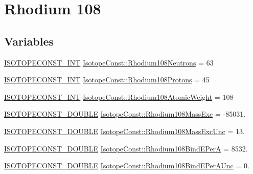 \hypertarget{group___isotope_const-_rhodium-_rh108}{}\section{Rhodium 108}
\label{group___isotope_const-_rhodium-_rh108}
\subsection*{Variables}
\begin{DoxyCompactItemize}
\item 
\mbox{\hyperlink{group___isotope_const-_macros_ga5f18360b3e99483a35c32d789e62621c}{I\+S\+O\+T\+O\+P\+E\+C\+O\+N\+S\+T\+\_\+\+I\+NT}} \mbox{\hyperlink{group___isotope_const-_rhodium-_rh108_gaa0fa457bb397a812bdfd349813702d45}{Isotope\+Const\+::\+Rhodium108\+Neutrons}} = 63
\item 
\mbox{\hyperlink{group___isotope_const-_macros_ga5f18360b3e99483a35c32d789e62621c}{I\+S\+O\+T\+O\+P\+E\+C\+O\+N\+S\+T\+\_\+\+I\+NT}} \mbox{\hyperlink{group___isotope_const-_rhodium-_rh108_ga2df4b40d94f011ac603d881c2924f16b}{Isotope\+Const\+::\+Rhodium108\+Protons}} = 45
\item 
\mbox{\hyperlink{group___isotope_const-_macros_ga5f18360b3e99483a35c32d789e62621c}{I\+S\+O\+T\+O\+P\+E\+C\+O\+N\+S\+T\+\_\+\+I\+NT}} \mbox{\hyperlink{group___isotope_const-_rhodium-_rh108_ga36149ba214a102f48cf8ac83f39deeb5}{Isotope\+Const\+::\+Rhodium108\+Atomic\+Weight}} = 108
\item 
\mbox{\hyperlink{group___isotope_const-_macros_ga8f45a7272ce02c0b4c65c44636ed719a}{I\+S\+O\+T\+O\+P\+E\+C\+O\+N\+S\+T\+\_\+\+D\+O\+U\+B\+LE}} \mbox{\hyperlink{group___isotope_const-_rhodium-_rh108_ga2a0e3df50c30e365fadfd19e0c9fe13a}{Isotope\+Const\+::\+Rhodium108\+Mass\+Exc}} = -\/85031.
\item 
\mbox{\hyperlink{group___isotope_const-_macros_ga8f45a7272ce02c0b4c65c44636ed719a}{I\+S\+O\+T\+O\+P\+E\+C\+O\+N\+S\+T\+\_\+\+D\+O\+U\+B\+LE}} \mbox{\hyperlink{group___isotope_const-_rhodium-_rh108_ga1e715a1ac77df413a427338ef7fdb6e5}{Isotope\+Const\+::\+Rhodium108\+Mass\+Exc\+Unc}} = 13.
\item 
\mbox{\hyperlink{group___isotope_const-_macros_ga8f45a7272ce02c0b4c65c44636ed719a}{I\+S\+O\+T\+O\+P\+E\+C\+O\+N\+S\+T\+\_\+\+D\+O\+U\+B\+LE}} \mbox{\hyperlink{group___isotope_const-_rhodium-_rh108_gadaabb90e3df32331af9ccd6811ad65a4}{Isotope\+Const\+::\+Rhodium108\+Bind\+E\+PerA}} = 8532.
\item 
\mbox{\hyperlink{group___isotope_const-_macros_ga8f45a7272ce02c0b4c65c44636ed719a}{I\+S\+O\+T\+O\+P\+E\+C\+O\+N\+S\+T\+\_\+\+D\+O\+U\+B\+LE}} \mbox{\hyperlink{group___isotope_const-_rhodium-_rh108_ga0c393e758fdaecdcf4aa5c77d923ac08}{Isotope\+Const\+::\+Rhodium108\+Bind\+E\+Per\+A\+Unc}} = 0.

\end{DoxyCompactItemize}
